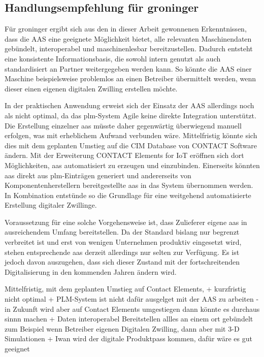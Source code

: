 \newpage
\subsection{Handlungsempfehlung für groninger}

Für groninger ergibt sich aus den in dieser Arbeit gewonnenen Erkenntnissen, dass die AAS eine geeignete Möglichkeit bietet, alle relevanten Maschinendaten gebündelt, interoperabel und maschinenlesbar bereitzustellen. 
Dadurch entsteht eine konsistente Informationsbasis, die sowohl intern genutzt als auch standardisiert an Partner weitergegeben werden kann. 
So könnte die AAS einer Maschine beispielsweise problemlos an einen Betreiber übermittelt werden, wenn dieser einen eigenen digitalen Zwilling erstellen möchte.

In der praktischen Anwendung erweist sich der Einsatz der AAS allerdings noch als nicht optimal, da das \acs{plm}-System Agile keine direkte Integration unterstützt. 
Die Erstellung einzelner \acs{aas} müsste daher gegenwärtig überwiegend manuell erfolgen, was mit erheblichem Aufwand verbunden wäre. 
Mittelfristig könnte sich dies mit dem geplanten Umstieg auf die CIM Database von CONTACT Software ändern.
Mit der Erweiterung CONTACT Elements for IoT eröffnen sich dort Möglichkeiten, \acs{aas} automatisiert zu erzeugen und einzubinden. 
Einerseits könnten \acs{aas} direkt aus \acs{plm}-Einträgen generiert und andererseits von Komponentenherstellern bereitgestellte \acs{aas} in das System übernommen werden. 
In Kombination entstünde so die Grundlage für eine weitgehend automatisierte Erstellung digitaler Zwillinge.

Voraussetzung für eine solche Vorgehensweise ist, dass Zulieferer eigene \acs{aas} in ausreichendem Umfang bereitstellen. 
Da der Standard bislang nur begrenzt verbreitet ist und erst von wenigen Unternehmen produktiv eingesetzt wird, stehen entsprechende \acs{aas} derzeit allerdings nur selten zur Verfügung. 
Es ist jedoch davon auszugehen, dass sich dieser Zustand mit der fortschreitenden Digitalisierung in den kommenden Jahren ändern wird.


Mittelfristig, mit dem geplanten Umstieg auf Contact Elements, 
+ kurzfristig nicht optimal
+ PLM-System ist nicht dafür ausgelget mit der AAS zu arbeiten - in Zukunft wird aber auf Contact Elements umgestiegen dann könnte es durchaus sinnn machen
+ Daten interoperabel Bereitstellen allles an einem ort gebündelt zum Beispiel wenn Betreiber eigenen Digitalen Zwilling, dann aber mit 3-D Simulationen
+ Iwan wird der digitale Produktpass kommen, dafür wäre es gut geeignet

